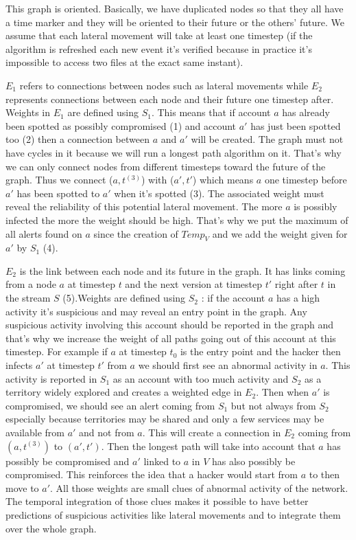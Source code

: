\documentclass[11pt]{article}
\begin{document}
This graph is oriented. Basically, we have duplicated nodes so that they all have a time marker and they will be oriented to their future or the others' future. We assume that each lateral movement will take at least one timestep (if the algorithm is refreshed each new event it's verified because in practice it's impossible to access two files at the exact same instant).

$E_1$ refers to connections between nodes such as lateral movements while $E_2$ represents connections between each node and their future one timestep after. Weights in $E_1$ are defined using $S_1$. This means that if account $a$ has already been spotted as possibly compromised (1) and account $a'$ has just been spotted too (2) then a connection between $a$ and $a'$ will be created. The graph must not have cycles in it because we will run a longest path algorithm on it. That's why we can only connect nodes from different timesteps toward the future of the graph. Thus we connect ($a,t^{(3)}$) with ($a',t'$) which means $a$ one timestep before $a'$ has been spotted to $a'$ when it's spotted (3). The associated weight must reveal the reliability of this potential lateral movement. The more $a$ is possibly infected the more the weight should be high. That's why we put the maximum of all alerts found on $a$ since the creation of $Temp_V$ and we add the weight given for $a'$ by $S_1$ (4).

$E_2$ is the link between each node and its future in the graph. It has links coming from a node $a$ at timestep $t$ and the next version at timestep $t'$ right after $t$ in the stream $S$ (5).Weights are defined using $S_2$ : if the account $a$ has a high activity it's suspicious and may reveal an entry point in the graph. Any suspicious activity involving this account should be reported in the graph and that's why we increase the weight of all paths going out of this account at this timestep. For example if $a$ at timestep $t_0$ is the entry point and the hacker then infects $a'$ at timestep $t'$ from $a$ we should first see an abnormal activity in $a$. This activity is reported in $S_1$ as an account with too much activity and $S_2$ as a territory widely explored and creates a weighted edge in $E_2$. Then when $a'$ is compromised, we should see an alert coming from $S_1$ but not always from $S_2$ especially because territories may be shared and only a few services may be available from $a'$ and not from $a$. This will create a connection in $E_2$ coming from $(a,t^{(3)})$ to $(a',t')$. Then the longest path will take into account that $a$ has possibly be compromised and $a'$ linked to $a$ in $V$ has also possibly be compromised. This reinforces the idea that a hacker would start from $a$ to then move to $a'$. All those weights are small clues of abnormal activity of the network. The temporal integration of those clues makes it possible to have better predictions of suspicious activities like lateral movements and to integrate them over the whole graph.
\end{document}
